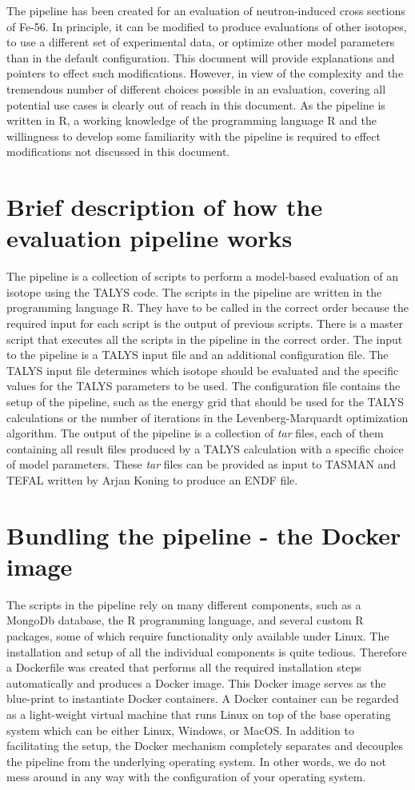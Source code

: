 \documentclass[12pt,a4paper]{scrartcl}
\begin{document}
 The pipeline has been created for an evaluation of neutron-induced cross sections of Fe-56.
 In principle, it can be modified to produce evaluations of other isotopes, to use a different set of experimental data, or optimize other model parameters than in the default configuration.
 This document will provide explanations and pointers to effect such modifications.
 However, in view of the complexity and the tremendous number of different choices possible in an evaluation, covering all potential use cases is clearly out of reach in this document.
 As the pipeline is written in R, a working knowledge of the programming language R and the willingness to develop some familiarity with the pipeline is required to effect modifications not discussed in this document.
 
 \section{Brief description of how the evaluation pipeline works}
 The pipeline is a collection of scripts to perform a model-based evaluation of an isotope using the TALYS code.
 The scripts in the pipeline are written in the programming language R.
 They have to be called in the correct order because the required input for each script is the output of previous scripts.
 There is a master script that executes all the scripts in the pipeline in the correct order.
 The input to the pipeline is a TALYS input file and an additional configuration file.
 The TALYS input file determines which isotope should be evaluated and the specific values for the TALYS parameters to be used.
 The configuration file contains the setup of the pipeline, such as the energy grid that should be used for the TALYS calculations or the number of iterations in the Levenberg-Marquardt optimization algorithm.
 The output of the pipeline is a collection of \textit{tar} files, each of them containing all result files produced by a TALYS calculation with a specific choice of model parameters.
 These \textit{tar} files can be provided as input to TASMAN and TEFAL written by Arjan Koning to produce an ENDF file.
 
\section{Bundling the pipeline - the Docker image} 
The scripts in the pipeline rely on many different components, such as a MongoDb database, the R programming language, and several custom R packages, some of which require functionality only available under Linux.
The installation and setup of all the individual components is quite tedious.
Therefore a Dockerfile was created that performs all the required installation steps automatically and produces a Docker image. This Docker image serves as the blue-print to instantiate Docker containers. A Docker container can be regarded as a light-weight virtual machine that runs Linux on top of the base operating system which can be either Linux, Windows, or MacOS.
In addition to facilitating the setup, the Docker mechanism completely separates and decouples the pipeline from the underlying operating  system.
In other words, we do not mess around in any way with the configuration of your operating system.
\end{document}

